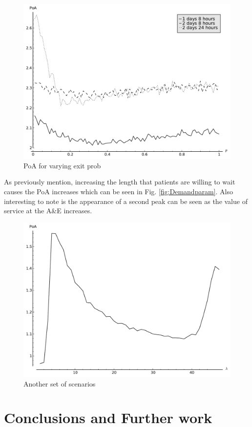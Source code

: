 \documentclass[12pt]{article}
\begin{document}
\begin{figure}[!hbtp]
    \begin{center}
        \includegraphics[width=.8\textwidth]{Images/AnaExit.pdf}
    \end{center}
    \caption{PoA for varying exit prob}\label{anaexit}
\end{figure}
As previously mention, increasing the length that patients are willing to wait causes the PoA increases
 which can be seen in Fig. \ref{fig:Demandparam}. Also interesting to note is the appearance of a second peak can be seen as the value of service at the A\&E increases.

\begin{figure}[!hbtp]
    \begin{center}
        \includegraphics[width=.8\textwidth]{Images/DualPeak.pdf}
    \end{center}
    \caption{Another set of scenarios}\label{dualpeak}
\end{figure}

\section{Conclusions and Further work}\label{conclusions}
\end{document}
